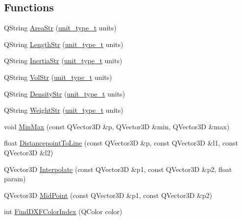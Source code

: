 \subsection*{Functions}
\begin{DoxyCompactItemize}
\item 
Q\-String \hyperlink{namespaceShipCAD_a2d7cf2fbcca4bd1dd75fd9ceb4ff0fa9}{Area\-Str} (\hyperlink{namespaceShipCAD_ac6a7a28b4b063771afae92decb602da5}{unit\-\_\-type\-\_\-t} units)
\item 
Q\-String \hyperlink{namespaceShipCAD_aef3e2265fc686fbe6b50b081dcc4e6ff}{Length\-Str} (\hyperlink{namespaceShipCAD_ac6a7a28b4b063771afae92decb602da5}{unit\-\_\-type\-\_\-t} units)
\item 
Q\-String \hyperlink{namespaceShipCAD_a01d1e42109b5645919c004f6d7a30b68}{Inertia\-Str} (\hyperlink{namespaceShipCAD_ac6a7a28b4b063771afae92decb602da5}{unit\-\_\-type\-\_\-t} units)
\item 
Q\-String \hyperlink{namespaceShipCAD_a0758fd8275aafe6ad813d2a361281bf2}{Vol\-Str} (\hyperlink{namespaceShipCAD_ac6a7a28b4b063771afae92decb602da5}{unit\-\_\-type\-\_\-t} units)
\item 
Q\-String \hyperlink{namespaceShipCAD_af977e4008c66d1a323d105f27622991b}{Density\-Str} (\hyperlink{namespaceShipCAD_ac6a7a28b4b063771afae92decb602da5}{unit\-\_\-type\-\_\-t} units)
\item 
Q\-String \hyperlink{namespaceShipCAD_a62749df66958d1389c3cc6f6f03d42fb}{Weight\-Str} (\hyperlink{namespaceShipCAD_ac6a7a28b4b063771afae92decb602da5}{unit\-\_\-type\-\_\-t} units)
\item 
void \hyperlink{namespaceShipCAD_aa5d3fc63603d716d3e24244049e1e510}{Min\-Max} (const Q\-Vector3\-D \&p, Q\-Vector3\-D \&min, Q\-Vector3\-D \&max)
\item 
float \hyperlink{namespaceShipCAD_a69361fa79b1f818e21306f6266ee45d3}{Distancepoint\-To\-Line} (const Q\-Vector3\-D \&p, const Q\-Vector3\-D \&l1, const Q\-Vector3\-D \&l2)
\item 
Q\-Vector3\-D \hyperlink{namespaceShipCAD_a83f7c2b40959a0d02a2cc1085b0d07ee}{Interpolate} (const Q\-Vector3\-D \&p1, const Q\-Vector3\-D \&p2, float param)
\item 
Q\-Vector3\-D \hyperlink{namespaceShipCAD_ad1ad66c896fe763fb4603989ff1f1182}{Mid\-Point} (const Q\-Vector3\-D \&p1, const Q\-Vector3\-D \&p2)
\item 
int \hyperlink{namespaceShipCAD_a87efc267ae07a84fb1cd55a4562c2907}{Find\-D\-X\-F\-Color\-Index} (Q\-Color color)
\item 

\end{DoxyCompactItemize}
